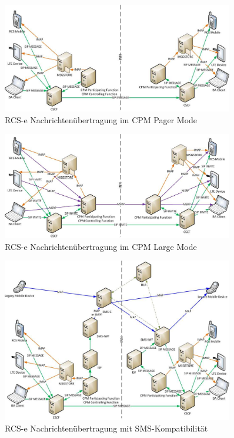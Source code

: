 \documentclass[german,12pt,a4paper]{article}
\begin{document}
 \begin{figure}
     \centering
     \includegraphics[width=0.9\textwidth]{img/rcs-e-pager}
     \caption{RCS-e Nachrichtenübertragung im CPM Pager Mode \cite{rcs:spec}}
     \label{fig:rcs-e-pager}
 \end{figure}

 \begin{figure}
     \centering
     \includegraphics[width=0.9\textwidth]{img/rcs-e-large}
     \caption{RCS-e Nachrichtenübertragung im CPM Large Mode \cite{rcs:spec}}
     \label{fig:rcs-e-large}
 \end{figure}

 \begin{figure}
     \centering
     \includegraphics[width=0.9\textwidth]{img/rcs-e-sms}
     \caption{RCS-e Nachrichtenübertragung mit SMS-Kompatibilität \cite{rcs:spec}}
     \label{fig:rcs-e-sms}
 \end{figure}
\end{document}

